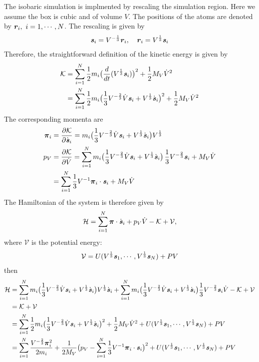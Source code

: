 \documentclass[aps, pre, preprint,unsortedaddress,a4paper,onecolumn]{revtex4}
\newcommand{\vect}[1]{\textbf{\textit{#1}}}
\newcommand{\mypi}{\boldsymbol\pi}
\begin{document}
The isobaric simulation is implmented by rescaling the simulation region.
Here we assume the box is cubic and of volume $V$. The positions of the
atoms are denoted by $\vect r_i,\ i=1, \cdots, N$. 
The rescaling is given by
\begin{align}
  \vect s_i = V^{-\frac13} \vect r_i, \quad \vect r_i = V^{\frac13}\vect s_i
\end{align}
Therefore, the straightforward definition of the kinetic energy is given by
\begin{align}
  \mathcal K &=
  \sum_{i=1}^N \frac12 m_i \big(\frac{d}{dt} (V^{\frac13}\vect s_i) \big)^2
  +
  \frac 12 {M_V} \dot V^2 \\
  & =
  \sum_{i=1}^N \frac 12 m_i
  \big(\frac13 V^{-\frac23} \dot V \vect s_i + V^{\frac13}\dot{\vect s}_i\big)^2
  +
  \frac 12 {M_V} \dot V^2 
\end{align}
The corresponding momenta are
\begin{align}
  \mypi_i
  &=
  \frac{\partial \mathcal K}{\partial \dot{\vect s}_i} =
  m_i \big(\frac13 V^{-\frac23} \dot V \vect s_i + V^{\frac13}\dot{\vect s}_i\big) V^{\frac13}  \\
  p_V
  &=
  \frac{\partial \mathcal K}{\partial \dot{V}}
  =
  \sum_{i=1}^N m_i
  \big(\frac13 V^{-\frac23} \dot V \vect s_i + V^{\frac13}\dot{\vect s}_i\big)\,
  \frac13 V^{-\frac23}\vect s_i
  +
  {M_V}\dot V \\
  &=
  \sum_{i=1}^N 
  \frac13 V^{-1} \mypi_i\cdot\vect s_i + {M_V} \dot V
\end{align}
The Hamiltonian of the system is therefore given by
\begin{align}
  \mathcal H =
  \sum_{i=1}^N \mypi\cdot\dot{\vect s}_i + p_V \dot V - \mathcal K + \mathcal V,
\end{align}
where $\mathcal V$ is the potential energy:
\begin{align}
  \mathcal V = U(V^{\frac13}\vect s_1, \cdots, V^{\frac13}\vect s_N) + PV
\end{align}
then
\begin{align}\nonumber
  \mathcal H &=
  \sum_{i=1}^N
  m_i \big(\frac13 V^{-\frac23} \dot V \vect s_i + V^{\frac13}\dot{\vect s}_i\big) V^{\frac13}\dot{\vect s}_i
  + 
  \sum_{i=1}^N
  m_i \big(\frac13 V^{-\frac23} \dot V \vect s_i + V^{\frac13}\dot{\vect s}_i\big)
  \frac13 V^{-\frac23}\vect s_i \dot V
  - \mathcal K + \mathcal V \\
  & =
  \mathcal K + \mathcal V \\
  &=
  \sum_{i=1}^N \frac 12 m_i
  \big(\frac13 V^{-\frac23} \dot V \vect s_i + V^{\frac13}\dot{\vect s}_i\big)^2
  +
  \frac 12 {M_V} \dot V^2
  +
  U(V^{\frac13}\vect s_1, \cdots, V^{\frac13}\vect s_N) + PV \\
  &=
  \sum_{i=1}^N\frac{V^{-\frac23} \mypi_i^2}{2m_i}
  +
  \frac1{2{M_V}}\big(p_V - \sum_{i=1}^N\frac13V^{-1} \mypi_i\cdot\vect s_i\big)^2
  +
  U(V^{\frac13}\vect s_1, \cdots, V^{\frac13}\vect s_N) + PV 
\end{align}
\end{document}
